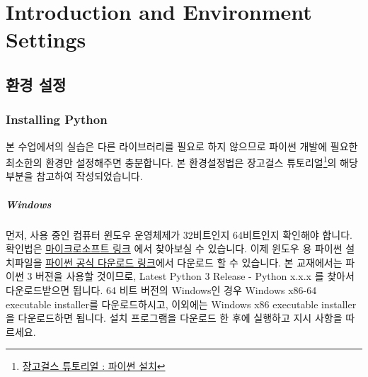 \documentclass[titlepage]{report}
\begin{document}
    
    



\chapter{Introduction and Environment Settings} 

\section{환경 설정}

\subsection{Installing Python}  
본 수업에서의 실습은 다른 라이브러리를 필요로 하지 않으므로 파이썬 개발에 필요한 최소한의 환경만 설정해주면 충분합니다. 본 환경설정법은 장고걸스 튜토리얼\footnote{\href{https://tutorial.djangogirls.org/ko/python\_installation/}{장고걸스 튜토리얼 : 파이썬 설치}}의 해당 부분을 참고하여 작성되었습니다. 

\paragraph{Windows} 

먼저, 사용 중인 컴퓨터 윈도우 운영체제가 32비트인지 64비트인지 확인해야 합니다. 확인법은 \href{https://support.microsoft.com/ko-kr/help/13443/windows-which-operating-system}{마이크로소프트 링크} 에서 찾아보실 수 있습니다. 이제 윈도우 용 파이썬 설치파일을 \href{https://www.python.org/downloads/windows/}{파이썬 공식 다운로드 링크}에서 다운로드 할 수 있습니다. 본 교재에서는 파이썬 3 버젼을 사용할 것이므로, Latest Python 3 Release - Python x.x.x 를 찾아서 다운로드받으면 됩니다. 64 비트 버전의 Windows인 경우 Windows x86-64 executable installer를 다운로드하시고, 이외에는 Windows x86 executable installer을 다운로드하면 됩니다. 설치 프로그램을 다운로드 한 후에 실행하고 지시 사항을 따르세요. 
\end{document}
